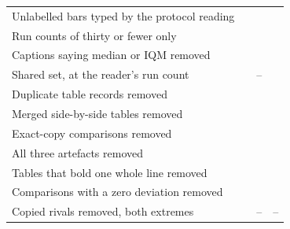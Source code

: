 \documentclass[sigconf,anonymous]{aamas}
\begin{document}
\begin{table}[t]
\begin{tabular}{@{}lrrl@{}}
Unlabelled bars typed by the protocol reading & \nTuN{} & \nTuPapers{} & \nTuFail{} \\
Run counts of thirty or fewer only & \nRBigNRemovedTestableN{} & \nRBigNRemovedTestablePapers{} & \nRBigNRemovedFail{} \nRBigNRemovedFailCi{} \\
Captions saying median or IQM removed & \nRMedianRemovedTestableN{} & \nRMedianRemovedTestablePapers{} & \nRMedianRemovedFail{} \nRMedianRemovedFailCi{} \\
Shared set, at the reader's run count & \nCzShared{} & -- & \nCzSharedReaderFailPct{} \\
Duplicate table records removed & \nRDupRemovedTestableN{} & \nRDupRemovedTestablePapers{} & \nRDupRemovedFail{} \nRDupRemovedFailCi{} \\
Merged side-by-side tables removed & \nRMergedRemovedTestableN{} & \nRMergedRemovedTestablePapers{} & \nRMergedRemovedFail{} \nRMergedRemovedFailCi{} \\
Exact-copy comparisons removed & \nRCopiesRemovedTestableN{} & \nRCopiesRemovedTestablePapers{} & \nRCopiesRemovedFail{} \nRCopiesRemovedFailCi{} \\
All three artefacts removed & \nRAllArtefactsRemovedTestableN{} & \nRAllArtefactsRemovedTestablePapers{} & \nRAllArtefactsRemovedFail{} \nRAllArtefactsRemovedFailCi{} \\
Tables that bold one whole line removed & \nROwnRowRemovedTestableN{} & \nROwnRowRemovedTestablePapers{} & \nROwnRowRemovedFail{} \nROwnRowRemovedFailCi{} \\
Comparisons with a zero deviation removed & \nRZeroRemovedTestableN{} & \nRZeroRemovedTestablePapers{} & \nRZeroRemovedFail{} \nRZeroRemovedFailCi{} \\
Copied rivals removed, both extremes & \nCopiedRemovedN{} & -- & \nFailCopiedRemovedLow{}--\nFailCopiedRemovedHigh{} \\
\bottomrule
\end{tabular}
\end{table}
\end{document}
